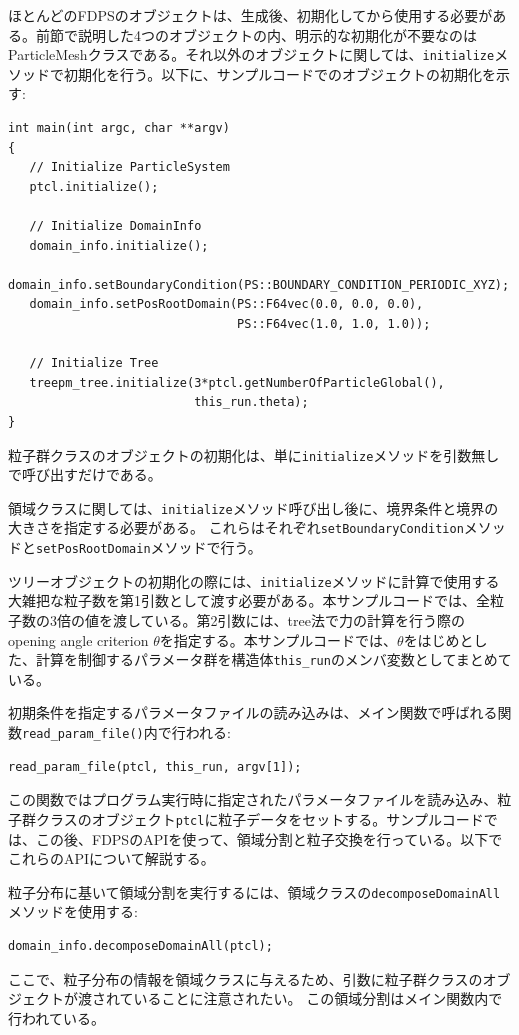 ほとんどのFDPSのオブジェクトは、生成後、初期化してから使用する必要がある。前節で説明した4つのオブジェクトの内、明示的な初期化が不要なのはParticleMeshクラスである。それ以外のオブジェクトに関しては、\texttt{initialize}メソッドで初期化を行う。以下に、サンプルコードでのオブジェクトの初期化を示す:
\begin{lstlisting}[caption=オブジェクトの初期化]
int main(int argc, char **argv)
{
   // Initialize ParticleSystem
   ptcl.initialize();

   // Initialize DomainInfo
   domain_info.initialize();  
   domain_info.setBoundaryCondition(PS::BOUNDARY_CONDITION_PERIODIC_XYZ);
   domain_info.setPosRootDomain(PS::F64vec(0.0, 0.0, 0.0), 
                                PS::F64vec(1.0, 1.0, 1.0));
                                
   // Initialize Tree
   treepm_tree.initialize(3*ptcl.getNumberOfParticleGlobal(),
                          this_run.theta);
}
\end{lstlisting}

粒子群クラスのオブジェクトの初期化は、単に\texttt{initialize}メソッドを引数無しで呼び出すだけである。


領域クラスに関しては、\texttt{initialize}メソッド呼び出し後に、境界条件と境界の大きさを指定する必要がある。
これらはそれぞれ\texttt{setBoundaryCondition}メソッドと\texttt{setPosRootDomain}メソッドで行う。

ツリーオブジェクトの初期化の際には、\texttt{initialize}メソッドに計算で使用する大雑把な粒子数を第1引数として渡す必要がある。本サンプルコードでは、全粒子数の3倍の値を渡している。第2引数には、tree法で力の計算を行う際のopening angle criterion $\theta$を指定する。本サンプルコードでは、$\theta$をはじめとした、計算を制御するパラメータ群を構造体\texttt{this\_run}のメンバ変数としてまとめている。


初期条件を指定するパラメータファイルの読み込みは、メイン関数で呼ばれる関数\texttt{read\_param\_file()}内で行われる:
\begin{lstlisting}
read_param_file(ptcl, this_run, argv[1]);
\end{lstlisting}
この関数ではプログラム実行時に指定されたパラメータファイルを読み込み、粒子群クラスのオブジェクト\texttt{ptcl}に粒子データをセットする。サンプルコードでは、この後、FDPSのAPIを使って、領域分割と粒子交換を行っている。以下でこれらのAPIについて解説する。

粒子分布に基いて領域分割を実行するには、領域クラスの\texttt{decomposeDomainAll}メソッドを使用する:
\begin{lstlisting}[caption=領域分割の実行]
domain_info.decomposeDomainAll(ptcl);
\end{lstlisting}
ここで、粒子分布の情報を領域クラスに与えるため、引数に粒子群クラスのオブジェクトが渡されていることに注意されたい。
この領域分割はメイン関数内で行われている。


